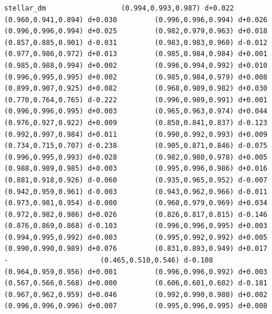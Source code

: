 \documentclass[11pt, letterpaper, openany]{book}
\begin{document}
\begin{empiricalbox}
\begin{lstlisting}[style=terminal]
stellar_dm                  (0.994,0.993,0.987) d+0.022         (0.960,0.941,0.894) d+0.030         (0.996,0.996,0.994) d+0.026         (0.996,0.996,0.994) d+0.025         (0.982,0.979,0.963) d+0.018         (0.857,0.885,0.901) d-0.031         (0.983,0.983,0.960) d-0.012         (0.977,0.986,0.972) d+0.013         (0.985,0.984,0.984) d+0.001         (0.985,0.988,0.994) d+0.002         (0.996,0.994,0.992) d+0.010         (0.996,0.995,0.995) d+0.002         (0.985,0.984,0.979) d+0.008         (0.899,0.907,0.925) d+0.082         (0.968,0.989,0.982) d+0.030         (0.770,0.764,0.765) d-0.222         (0.996,0.989,0.991) d+0.001         (0.996,0.996,0.995) d+0.003         (0.965,0.963,0.974) d+0.044         (0.976,0.927,0.922) d+0.009         (0.850,0.841,0.837) d-0.123         (0.992,0.997,0.984) d+0.011         (0.990,0.992,0.993) d+0.009         (0.734,0.715,0.707) d-0.238         (0.905,0.871,0.846) d-0.075         (0.996,0.995,0.993) d+0.028         (0.982,0.980,0.978) d+0.005         (0.988,0.989,0.985) d+0.003         (0.995,0.996,0.986) d+0.016         (0.881,0.918,0.926) d-0.060         (0.935,0.965,0.952) d-0.007         (0.942,0.959,0.961) d-0.003         (0.943,0.962,0.966) d-0.011         (0.973,0.981,0.954) d-0.000         (0.960,0.979,0.969) d+0.034         (0.972,0.982,0.986) d+0.026         (0.826,0.817,0.815) d-0.146         (0.876,0.869,0.868) d-0.103         (0.996,0.996,0.995) d+0.003         (0.994,0.995,0.992) d+0.003         (0.995,0.992,0.992) d+0.005         (0.990,0.990,0.989) d+0.076         (0.831,0.893,0.949) d+0.017                      -                      (0.465,0.510,0.546) d-0.108         (0.964,0.959,0.956) d+0.001         (0.996,0.996,0.992) d+0.003         (0.567,0.566,0.568) d+0.000         (0.606,0.601,0.602) d-0.181         (0.967,0.962,0.959) d+0.046         (0.992,0.990,0.980) d+0.002         (0.996,0.996,0.996) d+0.007         (0.995,0.996,0.995) d+0.008     

\end{lstlisting}
\end{empiricalbox}
\end{document}
